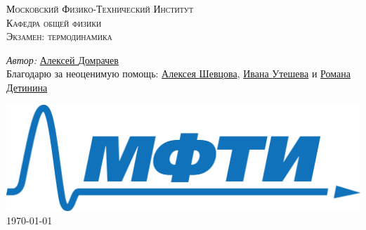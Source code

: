 
	\begin{titlepage}
		

		
		
		\center %
		
		
		
		
		\textsc{\LARGE Московский Физико-Технический Институт}\\[1,5cm] %
		\textsc{\Large Кафедра общей физики}\\[0.5cm]
		\textsc{\large Экзамен: термодинамика}\\[0.5cm] %
		
		

		
		
		
		
			\begin{center} \large
				\emph{Автор:} \href{https://vk.com/domrachev_alexey}{Алексей \textsf{Домрачев}}\\
				Благодарю за неоценимую помощь: \href{https://vk.com/shevtsovalexey}{Алексея \textsf{Шевцова}}, \href{https://vk.com/uteshevia}{Ивана \textsf{Утешева}} и \href{https://vk.com/detinin_roman}{Романа \textsf{Детинина}}
			\end{center}

		
		
		\begin{bottompar}
			\includegraphics[width = 80 mm]{logo.png}	\\[1,0cm]
			{\large \today}
		\end{bottompar}
		\vfill %
		
	\end{titlepage}

